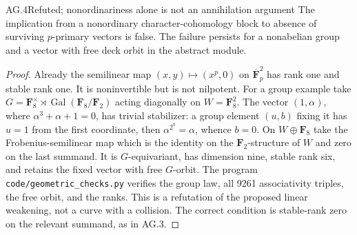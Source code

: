 \begin{claim}{AG.4}{Refuted; nonordinariness alone is not an annihilation argument}
The implication from a nonordinary character-cohomology block
to absence of surviving $p$-primary vectors is false. The failure
persists for a nonabelian group and a vector with free deck orbit
in the abstract module.
\end{claim}
\begin{proof}
Already the semilinear map
$(x,y)\mapsto(x^p,0)$ on $\overline{\mathbf F}_p^2$ has rank
one and stable rank one. It is noninvertible but is not
nilpotent. For a group example take
$G=\mathbf F_8^\times\rtimes\operatorname{Gal}(\mathbf F_8/\mathbf F_2)$
acting diagonally on $W=\mathbf F_8^2$. The vector $(1,\alpha)$,
where $\alpha^3+\alpha+1=0$, has trivial stabilizer: a group
element $(u,b)$ fixing it has $u=1$ from the first coordinate,
then $\alpha^{2^b}=\alpha$, whence $b=0$.
On $W\oplus\mathbf F_8$ take the Frobenius-semilinear map
which is the identity on the $\mathbf F_2$-structure of $W$
and zero on the last summand. It is $G$-equivariant, has
dimension nine, stable rank six, and retains the fixed vector
with free $G$-orbit. The program
\texttt{code/geometric\_checks.py} verifies the group law,
all 9261 associativity triples, the free orbit, and the ranks.
This is a refutation of the proposed linear weakening, not a
curve with a collision. The correct condition is stable-rank
zero on the relevant summand, as in AG.3.
\end{proof}

